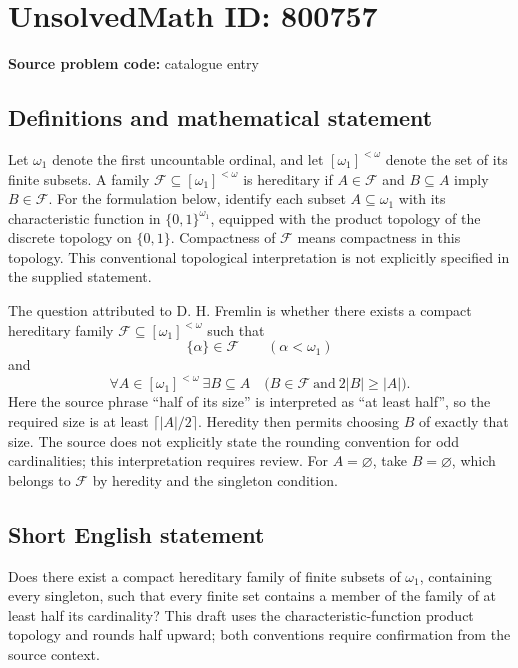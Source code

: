 \documentclass[11pt]{article}
\begin{document}
\section*{UnsolvedMath ID: 800757}
\textbf{Source problem code:} catalogue entry
\subsection{Definitions and mathematical statement}
Let \(\omega_1\) denote the first uncountable ordinal, and let \([\omega_1]^{<\omega}\) denote the set of its finite subsets. A family \(\mathcal F\subseteq[\omega_1]^{<\omega}\) is hereditary if \(A\in\mathcal F\) and \(B\subseteq A\) imply \(B\in\mathcal F\). For the formulation below, identify each subset \(A\subseteq\omega_1\) with its characteristic function in \(\{0,1\}^{\omega_1}\), equipped with the product topology of the discrete topology on \(\{0,1\}\). Compactness of \(\mathcal F\) means compactness in this topology. This conventional topological interpretation is not explicitly specified in the supplied statement.

The question attributed to D. H. Fremlin is whether there exists a compact hereditary family \(\mathcal F\subseteq[\omega_1]^{<\omega}\) such that
\[
\{\alpha\}\in\mathcal F\qquad(\alpha<\omega_1)
\]
and
\[
\forall A\in[\omega_1]^{<\omega}\ \exists B\subseteq A\quad
\bigl(B\in\mathcal F\ \text{and}\ 2|B|\ge |A|\bigr).
\]
Here the source phrase ``half of its size'' is interpreted as ``at least half'', so the required size is at least \(\lceil |A|/2\rceil\). Heredity then permits choosing \(B\) of exactly that size. The source does not explicitly state the rounding convention for odd cardinalities; this interpretation requires review. For \(A=\varnothing\), take \(B=\varnothing\), which belongs to \(\mathcal F\) by heredity and the singleton condition.
\subsection{Short English statement}
Does there exist a compact hereditary family of finite subsets of \(\omega_1\), containing every singleton, such that every finite set contains a member of the family of at least half its cardinality? This draft uses the characteristic-function product topology and rounds half upward; both conventions require confirmation from the source context.
\end{document}
